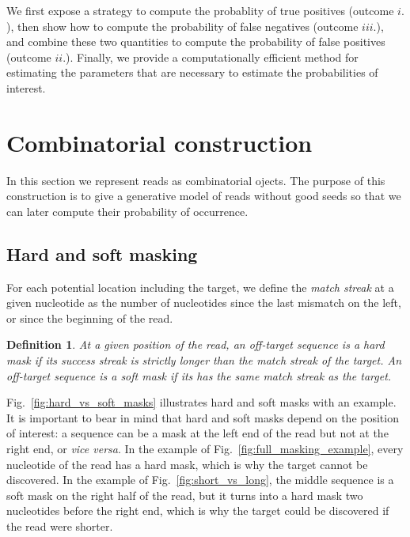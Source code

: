 \documentclass{article}
\newtheorem{definition}{Definition}
\begin{document}
We first expose a strategy to compute the probablity of true positives
(outcome $i.$), then show how to compute the probability of false
negatives (outcome $iii.$), and combine these two quantities to compute
the probability of false positives (outcome $ii.$). Finally, we provide a
computationally efficient method for estimating the parameters that are
necessary to estimate the probabilities of interest.


\section{Combinatorial construction}

In this section we represent reads as combinatorial ojects. The purpose of
this construction is to give a generative model of reads without good
seeds so that we can later compute their probability of occurrence.

\subsection{Hard and soft masking}

For each potential location including the target, we define the
\emph{match streak} at a given nucleotide as the number of nucleotides
since the last mismatch on the left, or since the beginning of the read.

\begin{definition}
At a given position of the read, an off-target sequence is a \emph{hard
mask} if its success streak is strictly longer than the match streak of
the target. An off-target sequence is a \emph{soft mask} if its has the
same match streak as the target.
\end{definition}

Fig.~\ref{fig:hard_vs_soft_masks} illustrates hard and soft masks with an
example. It is important to bear in mind that hard and soft masks depend
on the position of interest: a sequence can be a mask at the left end of
the read but not at the right end, or \textit{vice versa}. In the example
of Fig.~\ref{fig:full_masking_example}, every nucleotide of the read has a
hard mask, which is why the target cannot be discovered. In the example of
Fig.~\ref{fig:short_vs_long}, the middle sequence is a soft mask on the
right half of the read, but it turns into a hard mask two nucleotides
before the right end, which is why the target could be discovered if the
read were shorter.
\end{document}
